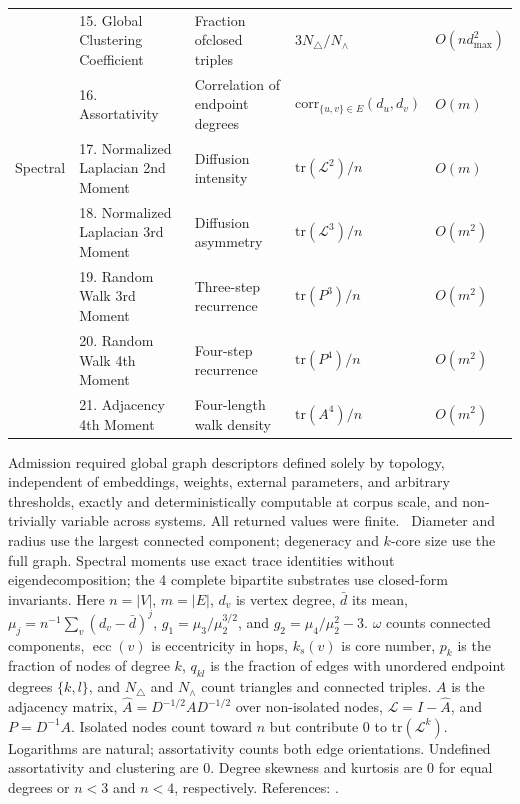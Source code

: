 \documentclass{article}
\begin{document}
\begin{table}[H]
\begin{tabularx}{\linewidth}{@{}ll>{\raggedright\arraybackslash}Xll@{}}
 & 15. Global Clustering Coefficient & Fraction of\newline closed triples & $3 N_{\triangle} / N_{\wedge}$ & $O(n d_{\max}^2)$ \\
 & 16. Assortativity & Correlation of endpoint degrees & $\mathrm{corr}_{\{u,v\} \in E}(d_u, d_v)$ & $O(m)$ \\
\addlinespace
Spectral & 17. Normalized Laplacian 2nd Moment & Diffusion intensity & $\mathrm{tr}(\mathcal{L}^2)/n$ & $O(m)$ \\
 & 18. Normalized Laplacian 3rd Moment & Diffusion asymmetry & $\mathrm{tr}(\mathcal{L}^3)/n$ & $O(m^2)$ \\
 & 19. Random Walk 3rd Moment & Three-step recurrence & $\mathrm{tr}(P^3)/n$ & $O(m^2)$ \\
 & 20. Random Walk 4th Moment & Four-step recurrence & $\mathrm{tr}(P^4)/n$ & $O(m^2)$ \\
 & 21. Adjacency 4th Moment & Four-length walk density & $\mathrm{tr}(A^4)/n$ & $O(m^2)$ \\
\bottomrule
\end{tabularx}
\par\vspace{12pt}
\begin{minipage}{\linewidth}
\footnotesize
Admission required global graph descriptors defined solely by topology, independent of embeddings, weights, external parameters, and arbitrary thresholds, exactly and deterministically computable at corpus scale, and non-trivially variable across systems. All returned values were finite. \dag~Diameter and radius use the largest connected component; degeneracy and $k$-core size use the full graph. Spectral moments use exact trace identities without eigendecomposition; the 4 complete bipartite substrates use closed-form invariants. Here $n = |V|$, $m = |E|$, $d_v$ is vertex degree, $\bar{d}$ its mean, $\mu_j = n^{-1} \sum_v (d_v - \bar{d})^j$, $g_1 = \mu_3 / \mu_2^{3/2}$, and $g_2 = \mu_4 / \mu_2^{2} - 3$. $\omega$ counts connected components, $\operatorname{ecc}(v)$ is eccentricity in hops, $k_s(v)$ is core number, $p_k$ is the fraction of nodes of degree $k$, $q_{kl}$ is the fraction of edges with unordered endpoint degrees $\{k, l\}$, and $N_{\triangle}$ and $N_{\wedge}$ count triangles and connected triples. $A$ is the adjacency matrix, $\hat{A} = D^{-1/2} A D^{-1/2}$ over non-isolated nodes, $\mathcal{L} = I - \hat{A}$, and $P = D^{-1} A$. Isolated nodes count toward $n$ but contribute 0 to $\mathrm{tr}(\mathcal{L}^k)$. Logarithms are natural; assortativity counts both edge orientations. Undefined assortativity and clustering are 0. Degree skewness and kurtosis are 0 for equal degrees or $n < 3$ and $n < 4$, respectively. References: \citep{ref49,ref50,ref51,ref52,ref61,ref62,ref63,ref64,ref79,ref112,ref114}.
\end{minipage}
\end{table}
\end{document}
